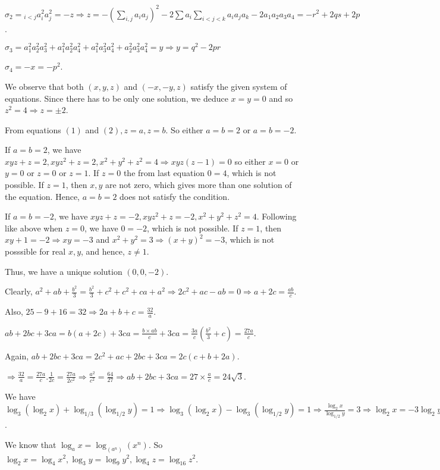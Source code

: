   $\sigma_2 = \displaystyle_{i<j}a_i^2a_j^2 = -z \Rightarrow z = -\left(\sum_{i,j}a_ia_j\right)^2 - 2\sum
  a_i\sum_{i<j<k}a_ia_ja_k - 2a_1a_2a_3a_4 = -r^2 + 2qs + 2p$.

  $\sigma_3 = a_1^2a_2^2a_3^2 + a_1^2a_2^2a_4^2 + a_1^2a_3^2a_4^2 + a_2^2a_3^2a_4^2 = y \Rightarrow y = q^2
  - 2pr$

  $\sigma_4 = -x = -p^2$.
\item We observe that both $(x, y, z)$ and $(-x, -y, z)$ satisfy the given system of equations. Since there
  has to be only one solution, we deduce $x = y = 0$ and so $z^2 = 4 \Rightarrow z = \pm 2$.

  From equations $(1)$ and $(2), z = a, z = b$. So either $a = b = 2$ or $a = b = -2$.

  If $a = b = 2$, we have $xyz + z = 2, xyz^2 + z = 2, x^2 + y^2 + z^2 = 4\Rightarrow xyz(z - 1) = 0$ so
  either $x = 0$ or $y = 0$ or $z = 0$ or $z = 1$. If $z = 0$ the from last equation $0 = 4$, which is not
  possible. If $z = 1$, then $x, y$ are not zero, which gives more than one solution of the equation. Hence,
  $a = b = 2$ does not satisfy the condition.

  If $a = b = -2$, we have $xyz + z = -2, xyz^2 + z = -2, x^2 + y^2 + z^2 = 4$. Following like above when $z
  = 0$, we have $0 = -2$, which is not possible. If $z = 1$, then $xy + 1 = -2\Rightarrow xy = -3$ and $x^2
  + y^2 = 3\Rightarrow (x + y)^2 = -3$, which is not posssible for real $x, y$, and hence, $z\neq 1$.

  Thus, we have a unique solution $(0, 0, -2)$.
\item Clearly, $a^2 + ab + \frac{b^2}{3} = \frac{b^2}{3} + c^2 + c^2 + ca + a^2\Rightarrow 2c^2 + ac - ab =
  0 \Rightarrow a + 2c = \frac{ab}{c}$.

  Also, $25 - 9 + 16 = 32 \Rightarrow 2a + b + c = \frac{32}{a}$.

  $ab + 2bc + 3ca = b(a + 2c) + 3ca = \frac{b\times ab}{c} + 3ca = \frac{3a}{c}\left(\frac{b^2}{3} +
  c\right) = \frac{27a}{c}$.

  Again, $ab + 2bc + 3ca = 2c^2 + ac + 2bc + 3ca = 2c(c + b + 2a)$.

  $\Rightarrow \frac{32}{a} = \frac{27a}{c}.\frac{1}{2c} = \frac{27a}{2c^2} \Rightarrow \frac{a^2}{c^2} =
  \frac{64}{27}\Rightarrow ab + 2bc + 3ca = 27\times\frac{a}{c} = 24\sqrt{3}$.
\item We have $\log_3(\log_2x) + \log_{1/3}(\log_{1/2}y) = 1 \Rightarrow \log_3(\log_2x) -
  \log_3(\log_{1/2}y) = 1 \Rightarrow \frac{\log_2x}{\log_{1/2}y} = 3 \Rightarrow \log_2x = -3\log_2y
  \Rightarrow \log_2xy^3 = 0 \Rightarrow xy^3 = 1 \Rightarrow y = \frac{1}{4}, x = 64$.
\item We know that $\log_ax = \log_{\left(a^n\right)}(x^n)$. So $\log_2x = \log_4x^2, \log_3y = \log_9y^2,
  \log_4z = \log_{16}z^2$.

